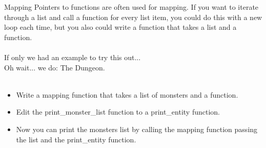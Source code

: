 \begin{frame}{Mapping}
	Pointers to functions are often used for mapping. If you want to iterate through a list and call a function for every list item, you could do this with a new loop each time, but you also could write a function that takes a list and a function.\\
	\ \\
	If only we had an example to try this out...\\
	Oh wait... we do: The Dungeon.\\\ \\
	\begin{itemize}
		\item Write a mapping function that takes a list of monsters and a function.
		\item Edit the print\_monster\_list function to a print\_entity function.
		\item Now you can print the monsters list by calling the mapping function passing the list and the print\_entity function.
	\end{itemize}
\end{frame}


